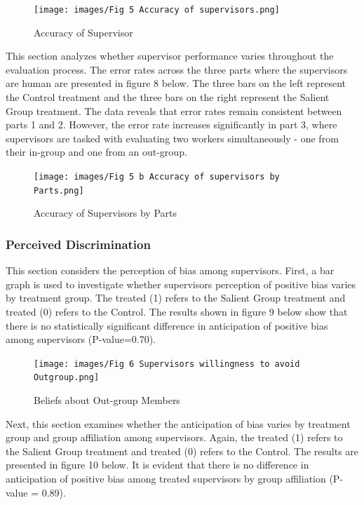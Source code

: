 \begin{figure}[H]
 \captionsetup{justification=raggedright,singlelinecheck=false}
\caption{Accuracy of Supervisor}
\texttt{[image: images/Fig 5 Accuracy of supervisors.png]} 
\end{figure}


This section analyzes whether supervisor performance varies throughout the evaluation process. The error rates across the three parts where the supervisors are human are presented in figure 8 below. The three bars on the left represent the Control treatment and the three bars on the right represent the Salient Group treatment. The data reveals that error rates remain consistent between parts 1 and 2. However, the error rate increases significantly in part 3, where supervisors are tasked with evaluating two workers simultaneously - one from their in-group and one from an out-group.

\begin{figure}[H]
 \captionsetup{justification=raggedright,singlelinecheck=false}
\caption{Accuracy of Supervisors by Parts}
\texttt{[image: images/Fig 5 b Accuracy of supervisors by Parts.png]} 
\end{figure}

\subsubsection{Perceived Discrimination}

This section considers the perception of bias among supervisors. First, a bar graph is used to investigate whether supervisors perception of positive bias varies by treatment group. The treated (1) refers to the Salient Group treatment and treated (0) refers to the Control. The results shown in figure 9 below show that there is no statistically significant difference in anticipation of positive bias among supervisors (P-value=0.70). 

\begin{figure}[H]
 \captionsetup{justification=raggedright,singlelinecheck=false}
\caption{Beliefs about Out-group Members}
\texttt{[image: images/Fig 6 Supervisors willingness to avoid Outgroup.png]} 
\end{figure}
Next, this section examines whether the anticipation of bias varies by treatment group and group affiliation among supervisors. Again, the treated (1) refers to the Salient Group treatment and treated (0) refers to the Control. The results are presented in figure 10 below. It is evident that there is no difference in anticipation of positive bias among treated supervisors by group affiliation (P-value = 0.89).

